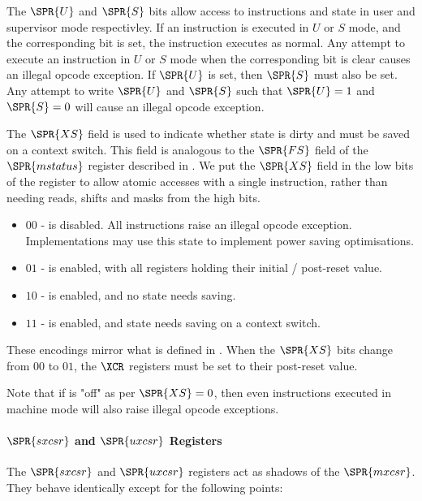 The $\SPR{U}$ and $\SPR{S}$ bits allow access to \XCID instructions and 
state in user and supervisor mode respectivley.
If an \XCID instruction is executed in $U$ or $S$ mode, and the 
corresponding bit is set, the instruction executes as normal.
Any attempt to execute an \XCID instruction in $U$ or $S$ mode when the 
corresponding bit is clear causes an illegal opcode exception.
If $\SPR{U}$ is set, then $\SPR{S}$ must also be set. Any attempt to write
$\SPR{U}$ and $\SPR{S}$
such that $\SPR{U}=1$ and $\SPR{S}=0$ will cause an illegal opcode exception.

The $\SPR{XS}$ field is used to indicate whether \XCID state is dirty and must be saved
on a context switch.
This field is analogous to the $\SPR{FS}$ field of the $\SPR{mstatus}$ register
described in \cite[Section 3.1.6.5]{SCARV:RV:ISA:II:17}.
We put the $\SPR{XS}$ field in the low bits of the register to allow
atomic accesses with a single  instruction, rather than needing
reads, shifts and masks from the high bits.

\begin{itemize}
\item $00$ - \XCID is disabled. All \XCID instructions raise an illegal opcode
    exception.
    Implementations may use this state \XCID to implement power saving 
    optimisations.
\item $01$ - \XCID is enabled, with all \XCID registers holding their initial
    / post-reset value.
\item $10$ - \XCID is enabled, and no state needs saving.
\item $11$ - \XCID is enabled, and state needs saving on a context switch.
\end{itemize}

These encodings mirror what is defined in
\cite[Section 3.1.6.5]{SCARV:RV:ISA:II:17}.
When the $\SPR{XS}$ bits change from $00$ to $01$, the $\XCR$ registers must be
set to their post-reset value.

Note that if \XCID is "off" as per $\SPR{XS}=0$, then even \XCID instructions
executed in machine mode will also raise illegal opcode exceptions.

\paragraph{$\SPR{sxcsr}$ and $\SPR{uxcsr}$ Registers}

The $\SPR{sxcsr}$ and $\SPR{uxcsr}$ registers act as shadows of the 
$\SPR{mxcsr}$. They behave identically except for the following points:

